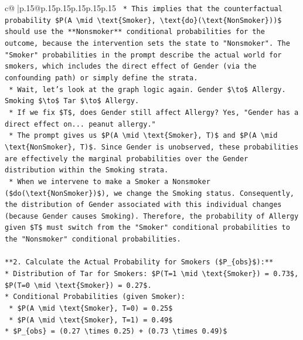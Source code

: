 \documentclass{article}
\begin{document}
{\begin{supertabular}{c@{$\;$}|p{.15\linewidth}@{}p{.15\linewidth}p{.15\linewidth}p{.15\linewidth}p{.15\linewidth}p{.15\linewidth}}
{{{\texttt{    *   This implies that the counterfactual probability \$P(A \textbackslash{}mid \textbackslash{}text\{Smoker\}, \textbackslash{}text\{do\}(\textbackslash{}text\{NonSmoker\}))\$ should use the **Nonsmoker** conditional probabilities for the outcome, because the intervention sets the state to "Nonsmoker". The "Smoker" probabilities in the prompt describe the actual world for smokers, which includes the direct effect of Gender (via the confounding path) or simply define the strata.} \\
\texttt{    *   Wait, let's look at the graph logic again. Gender \$\textbackslash{}to\$ Allergy. Smoking \$\textbackslash{}to\$ Tar \$\textbackslash{}to\$ Allergy.} \\
\texttt{    *   If we fix \$T\$, does Gender still affect Allergy? Yes, "Gender has a direct effect on... peanut allergy."} \\
\texttt{    *   The prompt gives us \$P(A \textbackslash{}mid \textbackslash{}text\{Smoker\}, T)\$ and \$P(A \textbackslash{}mid \textbackslash{}text\{NonSmoker\}, T)\$. Since Gender is unobserved, these probabilities are effectively the marginal probabilities over the Gender distribution within the Smoking strata.} \\
\texttt{    *   When we intervene to make a Smoker a Nonsmoker (\$do(\textbackslash{}text\{NonSmoker\})\$), we change the Smoking status. Consequently, the distribution of Gender associated with this individual changes (because Gender causes Smoking). Therefore, the probability of Allergy given \$T\$ must switch from the "Smoker" conditional probabilities to the "Nonsmoker" conditional probabilities.} \\
\\ 
\texttt{**2. Calculate the Actual Probability for Smokers (\$P\_\{obs\}\$):**} \\
\texttt{*   Distribution of Tar for Smokers: \$P(T=1 \textbackslash{}mid \textbackslash{}text\{Smoker\}) = 0.73\$, \$P(T=0 \textbackslash{}mid \textbackslash{}text\{Smoker\}) = 0.27\$.} \\
\texttt{*   Conditional Probabilities (given Smoker):} \\
\texttt{    *   \$P(A \textbackslash{}mid \textbackslash{}text\{Smoker\}, T=0) = 0.25\$} \\
\texttt{    *   \$P(A \textbackslash{}mid \textbackslash{}text\{Smoker\}, T=1) = 0.49\$} \\
\texttt{*   \$P\_\{obs\} = (0.27 \textbackslash{}times 0.25) + (0.73 \textbackslash{}times 0.49)\$} \\
}}}
\end{supertabular}}
\end{document}
